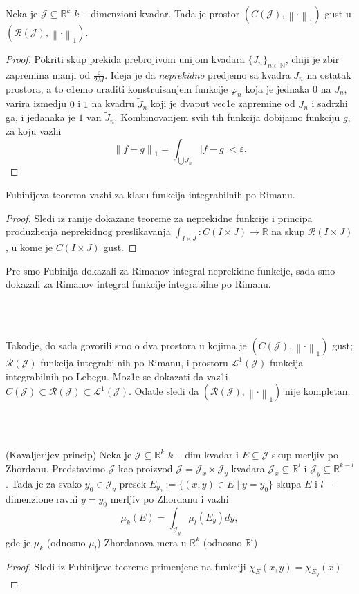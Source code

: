 \documentclass[a4paper,12pt]{article}
\newcommand{\NN}{\mathbb{N}}
\newcommand{\RR}{\mathbb{R}}
\newcommand{\eps}{\varepsilon}
\newcommand{\ps}{\subset}
\newcommand{\psj}{\subseteq}
\newcommand{\norm}[1]{\left\lVert#1\right\rVert}
\begin{document}
\begin{tvr}
	Neka je $\mathcal J \psj \RR^k$ $k-$dimenzioni kvadar. Tada je prostor $(C(\mathcal J), \norm{\cdot}_1)$
	gust u $(\mathcal R(\mathcal J), \norm{\cdot}_1)$.
\end{tvr}
\begin{proof}
	Pokriti skup prekida prebrojivom unijom kvadara $\{J_n\}_{n \in \NN}$, chiji je zbir zapre\-mina manji od $ \frac{\eps}{2M}$. Ideja
	je da \textit{neprekidno} predjemo sa kvadra $J_n$ na ostatak prostora, a to c1emo uraditi konstruisanjem funkcije
	$\varphi_n$ koja je jednaka $0$ na $J_n$, varira izmedju $0$ i $1$ na kvadru $\widetilde{J}_n$ koji je dvaput vec1e zapremine
	od $J_n$ i sadrzhi ga, i jedanaka je $1$ van $\widetilde{J}_n$. Kombinovanjem svih tih funkcija dobijamo funkciju $g$,
	za koju vazhi 
	\[  \norm{f - g}_1 = \int_{\bigcup \widetilde{J}_n} |f-g| < \eps.\] 
\end{proof}

\begin{tvr}
	Fubinijeva teorema vazhi za klasu funkcija integrabilnih po Rimanu.
\end{tvr}
\begin{proof}
	Sledi iz ranije dokazane teoreme za neprekidne funkcije i principa produzhenja neprekidnog preslikavanja
	$\int_{I\times J}: C(I\times J) \to \RR$ na skup $\mathcal R(I\times J)$, u kome je $C(I\times J)$ gust.
\end{proof}

\begin{nap}
	Pre smo Fubinija dokazali za Rimanov integral neprekidne funkcije, sada smo dokazali za Rimanov integral funkcije 
	integrabilne po Rimanu.
\end{nap}
\\ \\
\begin{nap}
Takodje, do sada govorili smo o dva prostora u kojima je $(C(\mathcal J), \norm{\cdot}_1)$ gust; $\mathcal{R}(\mathcal{J})$ funkcija integrabilnih po Rimanu, i prostoru $\mathcal{L}^1(\mathcal{J})$ funkcija integrabilnih po Lebegu. Moz1e se dokazati da vaz1i $C(\mathcal J) \ps \mathcal{R}(\mathcal{J}) \ps \mathcal{L}^1(\mathcal{J})$. Odatle sledi da $(\mathcal{R}(\mathcal J), \norm{\cdot}_1)$ nije kompletan.
\end{nap}
\\ \\
\begin{tma}(Kavaljerijev princip)
	Neka je $\mathcal J \psj \RR^k$ $k-$dim kvadar i $E\psj \mathcal J$ skup merljiv po Zhordanu. Predstavimo $\mathcal J$
	kao proizvod $\mathcal J = \mathcal J_x \times \mathcal J_y$ kvadara $\mathcal J_x \psj \RR^l$ i $\mathcal J_y \psj \RR^{k-l}$.
	Tada je za svako $y_0 \in \mathcal J_y$ presek $E_{y_0} := \{(x, y) \in E \mid y = y_0\}$ skupa $E$ i $l-$dimenzione ravni $y=y_0$
	merljiv po Zhordanu i vazhi 
	\[ \mu_k(E) = \int_{\mathcal J_y} \mu_l (E_y)dy ,\] 
	gde je $\mu_k$ (odnosno $\mu_l$) Zhordanova mera u $\RR^k$ (odnosno $\RR^l$)
\end{tma}
\begin{proof}
	Sledi iz Fubinijeve teoreme primenjene na funkciji $\chi_E(x, y) = \chi_{E_y}(x)$
\end{proof}
\end{document}
